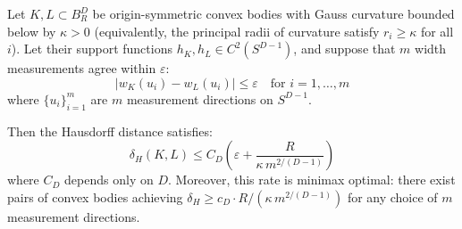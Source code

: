 \begin{theorem}
\label{thm:stability-general}
Let $K, L \subset B_R^D$ be origin-symmetric convex bodies with Gauss curvature bounded below by $\kappa > 0$ (equivalently, the principal radii of curvature satisfy $r_i \geq \kappa$ for all $i$). Let their support functions $h_K, h_L \in C^2(S^{D-1})$, and suppose that $m$ width measurements agree within $\varepsilon$:
\[
  |w_K(u_i) - w_L(u_i)| \leq \varepsilon \quad \text{for } i = 1, \ldots, m
\]
where $\{u_i\}_{i=1}^m$ are $m$ measurement directions on $S^{D-1}$.

Then the Hausdorff distance satisfies:
\[
  \boxed{\delta_H(K, L) \leq C_D \!\left(\varepsilon + \frac{R}{\kappa \, m^{2/(D-1)}}\right)}
\]
where $C_D$ depends only on $D$. Moreover, this rate is minimax optimal: there exist pairs of convex bodies achieving $\delta_H \geq c_D \cdot R / (\kappa \, m^{2/(D-1)})$ for any choice of $m$ measurement directions.
\end{theorem}

